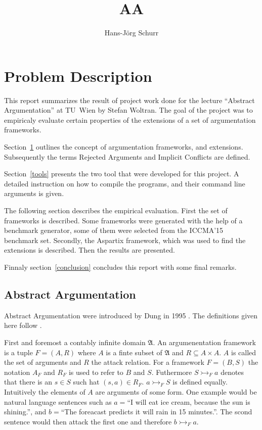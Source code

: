 \documentclass{scrartcl}
\title{AA}
\author{Hans-Jörg Schurr}
\begin{document}
\maketitle
\tableofcontents

\section{Problem Description}
\label{problemdesc}
This report summarizes the result of project work done for the lecture ``Abstract Argumentation'' at TU~Wien by
Stefan Woltran. The goal of the project was to empiricaly evaluate certain properties of the extensions of a set
of argumentation frameworks.

Section~\ref{problemdesc} outlines the concept of argumentation frameworks, and
extensions. Subsequently the terms Rejected Arguments and Implicit Conflicts
are defined.

Section~\ref{tools} presents the two tool that were developed for this project.
A detailed instruction on how to compile the programs, and their command line
arguments is given.

The following section describes the empirical evaluation. First the set of
frameworks is described.  Some frameworks were generated with the help of a
benchmark generator, some of them were selected from the ICCMA'15 benchmark
set. Secondly, the Aspartix framework, which was used to find the extensions
is described. Then the results are presented.

Finnaly section~\ref{conclusion} concludes this report with some final remarks.

\subsection{Abstract Argumentation}

Abstract Argumentation were introduced by Dung in 1995 \cite{dung1995}. The definitions given
here follow \cite{linsbichler2015hidden}.

First and foremost a contably infinite domain $\mathfrak{A}$. An
argumenentation framework is a tuple $F = (A,R)$ where $A$ is a finte subset of
$\mathfrak{A}$ and $R \subseteq A\times A$.  $A$ is called the set of arguments
and $R$ the attack relation.
For a framework $F = (B, S)$ the notation $A_F$
and $R_F$ is used to refer to $B$ and $S$. Futhermore $S \rightarrowtail_F a$
denotes that there is an $s \in S$ such hat $(s, a) \in R_F$. $a
\rightarrowtail_F S$ is defined equally. Intuitively the elements of $A$ are arguments of some form.
One example would be natural language sentences such as $a=$``I will eat ice cream, because the
sun is shining.'', and $b=$``The foreacast predicts it will rain in 15 minutes.''. The scond sentence
would then attack the first one and therefore $b \rightarrowtail_F a$.
\end{document}
